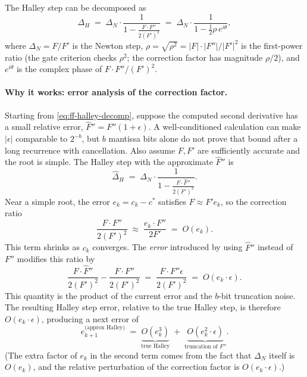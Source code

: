 The Halley step can be decomposed as
\begin{equation}\label{eq:ff-halley-decomp}
\Delta_H \;=\; \Delta_N \cdot \frac{1}{1 - \frac{F \cdot F''}{2(F')^2}}
\;=\; \Delta_N \cdot \frac{1}{1 - \tfrac{1}{2}\rho\, e^{i\theta}},
\end{equation}
where $\Delta_N = F/F'$ is the Newton step, $\rho = \sqrt{\rho^2} =
|F|\cdot|F''|/|F'|^2$ is the first-power ratio (the gate criterion checks
$\rho^2$; the correction factor has magnitude $\rho/2$), and $e^{i\theta}$
is the complex phase of $F \cdot F'' / (F')^2$.

\paragraph{Why it works: error analysis of the correction factor.}
Starting from \eqref{eq:ff-halley-decomp}, suppose the computed second
derivative has a small relative error,
$\hat{F}'' = F''(1 + \epsilon)$.  A well-conditioned calculation can make
$|\epsilon|$ comparable to $2^{-b}$, but $b$ mantissa bits alone do not
prove that bound after a long recurrence with cancellation.  Also assume
$F,F'$ are sufficiently accurate and the root is simple.  The
Halley step with the approximate $\hat{F}''$ is
\[
\hat{\Delta}_H \;=\; \Delta_N \cdot
  \frac{1}{1 - \frac{F \cdot \hat{F}''}{2(F')^2}}.
\]
Near a simple root, the error $e_k = c_k - c^*$ satisfies $F \approx F' e_k$,
so the correction ratio
\[
\frac{F \cdot F''}{2(F')^2} \;\approx\;
  \frac{e_k \cdot F''}{2 F'} \;=\; O(e_k).
\]
This term shrinks as $c_k$ converges.  The \emph{error} introduced by using
$\hat{F}''$ instead of $F''$ modifies this ratio by
\[
\frac{F \cdot \hat{F}''}{2(F')^2}
  - \frac{F \cdot F''}{2(F')^2}
  \;=\; \frac{F \cdot F'' \epsilon}{2(F')^2}
  \;=\; O(e_k \cdot \epsilon).
\]
This quantity is the product of the current error and the $b$-bit truncation noise.
The resulting Halley step error, relative to the true Halley step, is therefore
$O(e_k \cdot \epsilon)$, producing a next error of
\[
e_{k+1}^{\text{(approx Halley)}} \;=\;
  \underbrace{O(e_k^3)}_{\text{true Halley}}
  \;+\;
  \underbrace{O(e_k^2 \cdot \epsilon)}_{\text{truncation of } F''}.
\]
(The extra factor of $e_k$ in the second term comes from the fact that
$\Delta_N$ itself is $O(e_k)$, and the relative perturbation of the
correction factor is $O(e_k \cdot \epsilon)$.)

